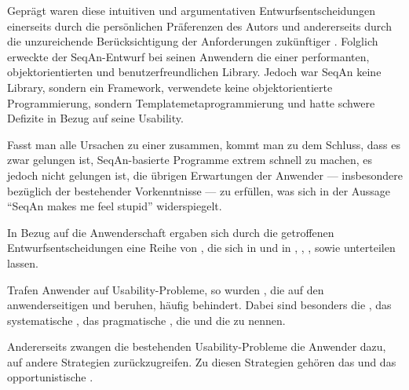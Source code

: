 Geprägt waren diese intuitiven und argumentativen Entwurfsentscheidungen einerseits durch die persönlichen Präferenzen des Autors und andererseits durch die unzureichende Berücksichtigung der Anforderungen zukünftiger . Folglich erweckte der SeqAn-Entwurf bei seinen Anwendern die  einer performanten, objektorientierten und benutzerfreundlichen Library. Jedoch war SeqAn keine Library, sondern ein Framework, verwendete keine objektorientierte Programmierung, sondern Templatemetaprogrammierung und hatte schwere Defizite in Bezug auf seine Usability.

Fasst man alle Ursachen zu einer zusammen, kommt man zu dem Schluss, dass es zwar gelungen ist, SeqAn-basierte Programme extrem schnell zu machen, es jedoch nicht gelungen ist, die übrigen Erwartungen der Anwender --- insbesondere bezüglich der  bestehender  Vorkenntnisse --- zu erfüllen, was sich in der Aussage ``SeqAn makes me feel stupid'' widerspiegelt.

In Bezug auf die Anwenderschaft ergaben sich durch die getroffenen Entwurfsentscheidungen eine Reihe von , die sich in  und in , , , sowie  unterteilen lassen.

Trafen Anwender auf Usability-Probleme, so wurden , die auf den anwenderseitigen  und  beruhen, häufig behindert. Dabei sind besonders die , das systematische , das pragmatische , die  und die  zu nennen.

Andererseits zwangen die bestehenden Usability-Probleme die Anwender dazu, auf andere Strategien zurückzugreifen. Zu diesen Strategien gehören das  und das opportunistische .%

